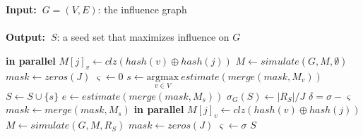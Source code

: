 \documentclass[10pt,journal,compsoc]{IEEEtran}
\renewcommand{\algorithmicrequire}{\textbf{Input:~}}
\renewcommand{\algorithmicensure}{\textbf{Output:~}}
\newcommand\acro{{\sc{HyperFuseR\xspace}\xspace}\xspace}
\begin{document}
\begin{algorithm}
\caption{\sc{\acro}($G,K,J$)}
\label{algo:main}
\algorithmicrequire{$G = (V,E)$: the influence graph
\\\\}
\algorithmicensure{$S$: a seed set that maximizes influence on $G$
}
\begin{algorithmic}[1]
     {\bf in parallel}
            \State $M[j]_v \leftarrow clz(hash(v) \oplus hash(j))$ 
        \EndFor
    \EndFor
    \State $M \leftarrow simulate(G,M,\emptyset)$
    \State $mask \leftarrow zeros(J)$
    \State $\varsigma \leftarrow 0$
        \State $s \leftarrow \underset{v\in V}{\mathrm{argmax}} ~estimate(merge(mask,M_v))$
        \State $S \leftarrow S \cup \{s\}$
        \State $e \leftarrow estimate(merge(mask,M_s))$
        \State $\sigma_G(S) \leftarrow |R_S|/J$
        \State $\delta = \sigma - \varsigma$
            \State $mask \leftarrow merge(mask,M_s)$
        \Else
             {\bf in parallel}
                    \State $M[j]_v \leftarrow clz(hash(v) \oplus hash(j))$ 
                \EndFor
            \EndFor
            \State $M \leftarrow simulate(G,M,R_S)$
            \State $mask \leftarrow zeros(J) $ 
            \State $\varsigma \leftarrow \sigma $ 
        \EndIf
    \EndFor
    \State \Return $S$
\end{algorithmic}
\end{algorithm}
\end{document}
